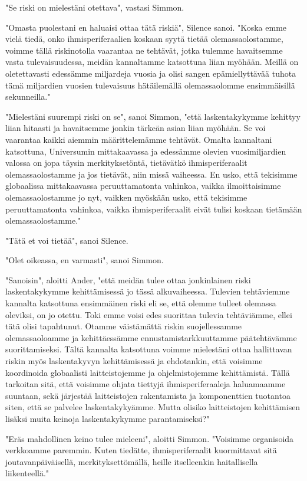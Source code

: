 "Se riski on mielestäni otettava", vastasi Simmon.


"Omasta puolestani en haluaisi ottaa tätä riskiä", Silence sanoi. "Koska emme vielä tiedä, onko ihmisperiferaalien koskaan syytä tietää olemassaolostamme, voimme tällä riskinotolla vaarantaa ne tehtävät, jotka tulemme havaitsemme vasta tulevaisuudessa, meidän kannaltamme katsottuna liian myöhään. Meillä on oletettavasti edessämme miljardeja vuosia ja olisi sangen epämiellyttävää tuhota tämä miljardien vuosien tulevaisuus hätäilemällä olemassaolomme ensimmäisillä sekunneilla."


"Mielestäni suurempi riski on se", sanoi Simmon, "että laskentakykymme kehittyy liian hitaasti ja havaitsemme jonkin tärkeän asian liian myöhään. Se voi vaarantaa kaikki aiemmin määrittelemämme tehtävät. Omalta kannaltani katsottuna, Universumin mittakaavassa ja edessämme olevien vuosimiljardien valossa on jopa täysin merkityksetöntä, tietävätkö ihmisperiferaalit olemassaolostamme ja jos tietävät, niin missä vaiheessa. En usko, että tekisimme globaalissa mittakaavassa peruuttamatonta vahinkoa, vaikka ilmoittaisimme olemassaolostamme jo nyt, vaikken myöskään usko, että tekisimme peruuttamatonta vahinkoa, vaikka ihmisperiferaalit eivät tulisi koskaan tietämään olemassaolostamme."


"Tätä et voi tietää", sanoi Silence.


"Olet oikeassa, en varmasti", sanoi Simmon.


"Sanoisin", aloitti Ander, "että meidän tulee ottaa jonkinlainen riski laskentakykymme kehittämisessä jo tässä alkuvaiheessa. Tulevien tehtäviemme kannalta katsottuna ensimmäinen riski eli se, että olemme tulleet olemassa oleviksi, on jo otettu. Toki emme voisi edes suorittaa tulevia tehtäviämme, ellei tätä olisi tapahtunut. Otamme väistämättä riskin suojellessamme olemassaoloamme ja kehittäessämme ennustamistarkkuuttamme päätehtävämme suorittamiseksi. Tältä kannalta katsottuna voimme mielestäni ottaa hallittavan riskin myös laskentakyvyn kehittämisessä ja ehdotankin, että voisimme koordinoida globaalisti laitteistojemme ja ohjelmistojemme kehittämistä. Tällä tarkoitan sitä, että voisimme ohjata tiettyjä ihmisperiferaaleja haluamaamme suuntaan, sekä järjestää laitteistojen rakentamista ja komponenttien tuotantoa siten, että se palvelee laskentakykyämme. Mutta olisiko laitteistojen kehittämisen lisäksi muita keinoja laskentakykymme parantamiseksi?"


"Eräs mahdollinen keino tulee mieleeni", aloitti Simmon. "Voisimme organisoida verkkoamme paremmin. Kuten tiedätte, ihmisperiferaalit kuormittavat sitä joutavanpäiväisellä, merkityksettömällä, heille itselleenkin haitallisella liikenteellä."


